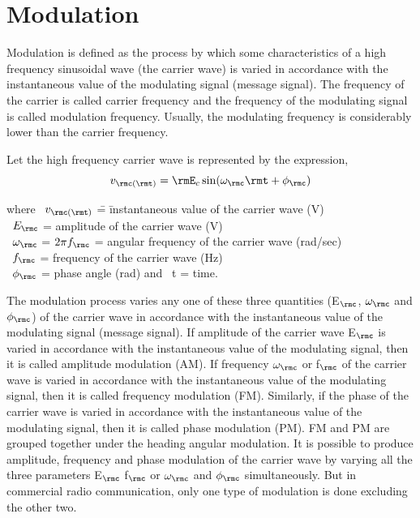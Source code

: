 \section{Modulation}\label{sec8.3}

Modulation is defined as the process by which some characteristics of
a high frequency sinusoidal wave (the carrier wave) is varied in
accordance with the instantaneous value of the modulating signal
(message signal). The frequency of the carrier is called carrier
frequency and the frequency of the modulating  signal is called
modulation frequency. Usually, the modulating frequency is
considerably lower than the carrier frequency.

Let the high frequency carrier wave is represented by the expression,
\begin{equation}
 v_{\rmc(\rmt)} = \rmE_c \sin (\omega_{\rmc}{\rmt} + \phi_{\rmc} )\label{eq8.1}
\end{equation}
\begin{tabbing}
where ~$v_{\rmc(\rmt)}$ \= = \= instantaneous value of the carrier wave
(V)\\[4pt]
\hspace{1.1cm} ~$E_{\rmc}$ \> = \> amplitude of the carrier wave (V)\\[4pt]
\hspace{1.1cm} ~$\omega_{\rmc}$ \> = \> $2 \pi f_{\rmc}$ = angular frequency of the
carrier wave (rad/sec)\\[4pt]
\hspace{1.13cm} ~$f_{\rmc}$ \> = \> frequency of the carrier wave (Hz)\\[4pt]
\hspace{1.13cm} ~$\phi_{\rmc}$ \> = \> phase angle (rad) and ~t = time.
\end{tabbing}

The modulation process varies any one of these three quantities
(E$_{\rmc}$, $\omega_{\rmc}$ and $\phi_{\rmc}$) of the carrier wave in
accordance with the instantaneous value of the modulating signal
(message signal). If amplitude of  the carrier wave E$_{\rmc}$ is
varied in accordance with the instantaneous value of the modulating
signal, then it is called amplitude modulation (AM). If frequency
$\omega_{\rmc}$ or f$_{\rmc}$ of the carrier wave is varied in
accordance with the instantaneous value of the modulating signal, then
it is called frequency modulation (FM). Similarly, if the phase of the
carrier wave is varied in accordance with the instantaneous value of
the modulating signal, then it is called phase modulation (PM). FM and
PM are grouped together under the heading angular modulation. It is
possible to produce amplitude, frequency and phase modulation of the
carrier wave by varying all the three parameters E$_{\rmc}$ f$_{\rmc}$
or $\omega_{\rmc}$ and $\phi_{\rmc}$ simultaneously. But in commercial
radio communication, only one type of modulation is done excluding the
other two.

